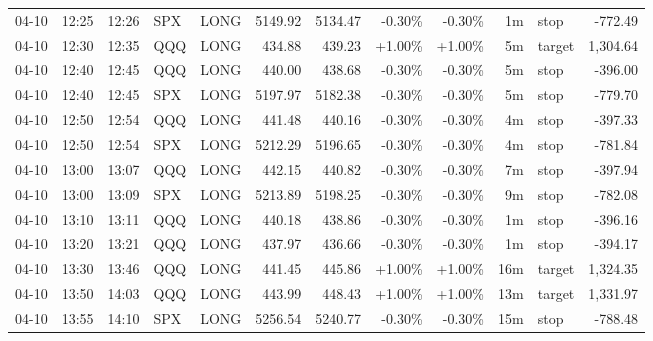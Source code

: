 \documentclass[11pt,a4paper]{article}
\begin{document}
\begin{center}
\begin{longtable}{>{\color{txtmain}}l l l l l r r r r r >{\color{txtmain}}l r}
04-10 & 12:25 & 12:26 & SPX & LONG & 5149.92 & 5134.47 & \textcolor{lossred}{-0.30\%} & \textcolor{lossred}{-0.30\%} & 1m & stop & \textcolor{lossred}{-772.49} \\
04-10 & 12:30 & 12:35 & QQQ & LONG & 434.88 & 439.23 & \textcolor{wingreen}{+1.00\%} & \textcolor{wingreen}{+1.00\%} & 5m & target & \textcolor{wingreen}{1,304.64} \\
04-10 & 12:40 & 12:45 & QQQ & LONG & 440.00 & 438.68 & \textcolor{lossred}{-0.30\%} & \textcolor{lossred}{-0.30\%} & 5m & stop & \textcolor{lossred}{-396.00} \\
04-10 & 12:40 & 12:45 & SPX & LONG & 5197.97 & 5182.38 & \textcolor{lossred}{-0.30\%} & \textcolor{lossred}{-0.30\%} & 5m & stop & \textcolor{lossred}{-779.70} \\
04-10 & 12:50 & 12:54 & QQQ & LONG & 441.48 & 440.16 & \textcolor{lossred}{-0.30\%} & \textcolor{lossred}{-0.30\%} & 4m & stop & \textcolor{lossred}{-397.33} \\
04-10 & 12:50 & 12:54 & SPX & LONG & 5212.29 & 5196.65 & \textcolor{lossred}{-0.30\%} & \textcolor{lossred}{-0.30\%} & 4m & stop & \textcolor{lossred}{-781.84} \\
04-10 & 13:00 & 13:07 & QQQ & LONG & 442.15 & 440.82 & \textcolor{lossred}{-0.30\%} & \textcolor{lossred}{-0.30\%} & 7m & stop & \textcolor{lossred}{-397.94} \\
04-10 & 13:00 & 13:09 & SPX & LONG & 5213.89 & 5198.25 & \textcolor{lossred}{-0.30\%} & \textcolor{lossred}{-0.30\%} & 9m & stop & \textcolor{lossred}{-782.08} \\
04-10 & 13:10 & 13:11 & QQQ & LONG & 440.18 & 438.86 & \textcolor{lossred}{-0.30\%} & \textcolor{lossred}{-0.30\%} & 1m & stop & \textcolor{lossred}{-396.16} \\
04-10 & 13:20 & 13:21 & QQQ & LONG & 437.97 & 436.66 & \textcolor{lossred}{-0.30\%} & \textcolor{lossred}{-0.30\%} & 1m & stop & \textcolor{lossred}{-394.17} \\
04-10 & 13:30 & 13:46 & QQQ & LONG & 441.45 & 445.86 & \textcolor{wingreen}{+1.00\%} & \textcolor{wingreen}{+1.00\%} & 16m & target & \textcolor{wingreen}{1,324.35} \\
04-10 & 13:50 & 14:03 & QQQ & LONG & 443.99 & 448.43 & \textcolor{wingreen}{+1.00\%} & \textcolor{wingreen}{+1.00\%} & 13m & target & \textcolor{wingreen}{1,331.97} \\
04-10 & 13:55 & 14:10 & SPX & LONG & 5256.54 & 5240.77 & \textcolor{lossred}{-0.30\%} & \textcolor{lossred}{-0.30\%} & 15m & stop & \textcolor{lossred}{-788.48} \\

\end{longtable}
\end{center}
\end{document}
